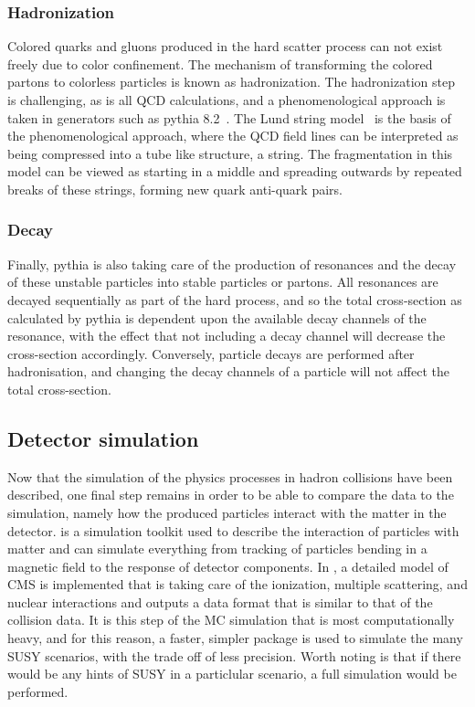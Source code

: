 \subsubsection*{Hadronization}
\noindent
\justify
Colored quarks and gluons produced in the hard scatter process can not exist freely due to color confinement. 
The mechanism of transforming the colored partons to colorless particles is known as hadronization. 
The hadronization step is challenging, as is all QCD calculations, and a phenomenological approach is taken in generators such as {\sc pythia} 8.2~\cite{Sjostrand:2014zea}.
The Lund string model~\cite{Andersson:1983ia} is the basis of the phenomenological approach, where the QCD field lines can be interpreted as being compressed into a tube like structure, a string. 
The fragmentation in this model can be viewed as starting in a middle and spreading outwards by repeated breaks of these strings, forming new quark anti-quark pairs. 
\subsubsection*{Decay}
\noindent
\justify
Finally, {\sc pythia} is also taking care of the production of resonances and the decay of these unstable particles into stable particles or partons.  
All resonances are decayed sequentially as part of the hard process, and so the total cross-section as calculated by {\sc pythia} is dependent upon the available decay channels of the resonance, with the effect that not including a decay channel will decrease the cross-section accordingly. 
Conversely, particle decays are performed after hadronisation, and changing the decay channels of a particle will not affect the total cross-section.  
\subsection*{Detector simulation}
\noindent
\justify
Now that the simulation of the physics processes in hadron collisions have been described, one final step remains in order to be able to compare the data to the simulation, namely how the produced particles interact with the matter in the detector. 
\GEANTfour is a simulation toolkit used to describe the interaction of particles with matter and can simulate everything from tracking of particles bending in a magnetic field to the response of detector components. 
In \GEANTfour, a detailed model of CMS is implemented that is taking care of the ionization, multiple scattering, and nuclear interactions and outputs a data format that is similar to that of the collision data. 
It is this step of the MC simulation that is most computationally heavy, and for this reason, a faster, simpler package is used to simulate the many SUSY scenarios, with the trade off of less precision. 
Worth noting is that if there would be any hints of SUSY in a particlular scenario, a full simulation would be performed.
